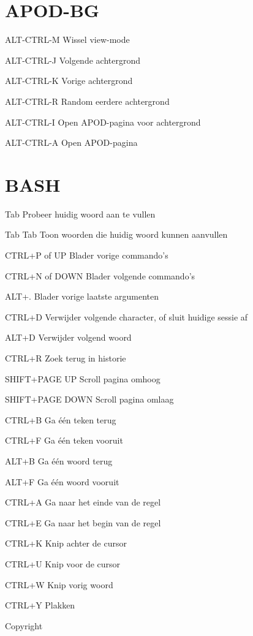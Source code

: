 \documentclass[10pt]{article}
\begin{document}
\begin{multicols}{3}
	\section{APOD-BG}
	\begin{ttdesc}[labelwidth=\widthof{\texttt{WIN-SHIFT+E}}]
	\item[ALT-CTRL-M] Wissel view-mode
	\item[ALT-CTRL-J] Volgende achtergrond
	\item[ALT-CTRL-K] Vorige achtergrond
	\item[ALT-CTRL-R] Random eerdere achtergrond
	\item[ALT-CTRL-I] Open APOD-pagina voor achtergrond
	\item[ALT-CTRL-A] Open APOD-pagina
	\end{ttdesc}

	\section{BASH}
	\begin{ttdesc}[labelwidth=\widthof{\texttt{Tab Tab}}]
	\item[Tab] Probeer huidig woord aan te vullen
	\item[Tab Tab] Toon woorden die huidig woord kunnen aanvullen
	\item[CTRL+P of UP] Blader vorige commando's
	\item[CTRL+N of DOWN] Blader volgende commando's
	\item[ALT+.] Blader vorige laatste argumenten
	\item[CTRL+D] Verwijder volgende character, of sluit huidige sessie af
	\item[ALT+D] Verwijder volgend woord
	\item[CTRL+R] Zoek terug in historie
	\item[SHIFT+PAGE UP] Scroll pagina omhoog
	\item[SHIFT+PAGE DOWN] Scroll pagina omlaag
	\item[CTRL+B] Ga \'{e}\'{e}n teken terug
	\item[CTRL+F] Ga \'{e}\'{e}n teken vooruit
	\item[ALT+B] Ga \'{e}\'{e}n woord terug
	\item[ALT+F] Ga \'{e}\'{e}n woord vooruit
	\item[CTRL+A] Ga naar het einde van de regel
	\item[CTRL+E] Ga naar het begin van de regel
	\item[CTRL+K] Knip achter de cursor 
	\item[CTRL+U] Knip voor de cursor 
	\item[CTRL+W] Knip vorig woord 
	\item[CTRL+Y] Plakken 
	\end{ttdesc}


	\noindent Copyright \textcopyright{} \thedate{} \theauthor{}

\end{multicols}
\end{document}
